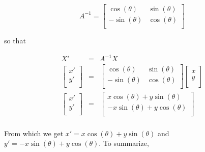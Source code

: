\vspace{-.05in}

\[ A^{-1} = \left[ \begin{array}{rr} \cos(\theta) & \sin(\theta) \\ -\sin(\theta) & \cos(\theta) \\ \end{array} \right] \]

so that

\[ \begin{array}{rcl}

X'& = & A^{-1} X \\ [5pt]
\left[ \begin{array}{c}x' \\ y'\\ \end{array} \right] & = & \left[ \begin{array}{rr} \cos(\theta) & \sin(\theta) \\ -\sin(\theta) & \cos(\theta) \\ \end{array} \right]\left[ \begin{array}{c}x \\ y\\ \end{array} \right] \\ [15pt]

\left[ \begin{array}{c}x' \\ y'\\ \end{array} \right] & = & \left[ \begin{array}{c}x \cos(\theta) + y\sin(\theta) \\- x \sin(\theta) + y\cos(\theta)  \\ \end{array} \right] \\ \end{array} \]

From which we get $x' = x \cos(\theta) + y\sin(\theta)$ and $y'=- x \sin(\theta) + y\cos(\theta)$.   To summarize, 

\medskip

